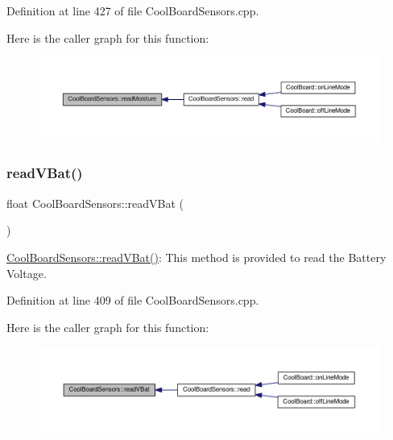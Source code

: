 Definition at line 427 of file Cool\+Board\+Sensors.\+cpp.

Here is the caller graph for this function\+:\nopagebreak
\begin{figure}[H]
\begin{center}
\leavevmode
\includegraphics[width=350pt]{class_cool_board_sensors_a8761bff50373c485f4465c8db47d0633_icgraph}
\end{center}
\end{figure}
\mbox{\label{class_cool_board_sensors_a6944b6ea7bce8e2fce1b434acfd9d5f3}} 
\subsubsection{\texorpdfstring{read\+V\+Bat()}{readVBat()}}
{\footnotesize\ttfamily float Cool\+Board\+Sensors\+::read\+V\+Bat (\begin{DoxyParamCaption}{ }\end{DoxyParamCaption})}

\hyperlink{class_cool_board_sensors_a6944b6ea7bce8e2fce1b434acfd9d5f3}{Cool\+Board\+Sensors\+::read\+V\+Bat()}\+: This method is provided to read the Battery Voltage. 

Definition at line 409 of file Cool\+Board\+Sensors.\+cpp.

Here is the caller graph for this function\+:\nopagebreak
\begin{figure}[H]
\begin{center}
\leavevmode
\includegraphics[width=350pt]{class_cool_board_sensors_a6944b6ea7bce8e2fce1b434acfd9d5f3_icgraph}
\end{center}
\end{figure}
\mbox{\label{class_cool_board_sensors_a406307ffd70272282d91479c7ed8d66f}} 
